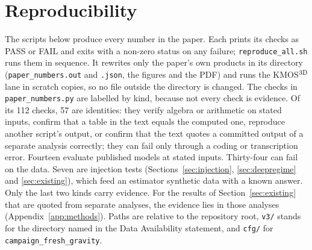 \documentclass[fleqn,usenatbib]{mnras}
\begin{document}
\section{Reproducibility}
\label{app:repro}
The scripts below produce every number in the paper. Each prints its checks as PASS or FAIL and exits with a non-zero status on any failure; \texttt{reproduce\_all.sh} runs them in sequence. It rewrites only the paper's own products in its directory (\texttt{paper\_numbers.out} and \texttt{.json}, the figures and the PDF) and runs the KMOS$^{\rm 3D}$ lane in scratch copies, so no file outside the directory is changed. The checks in \texttt{paper\_numbers.py} are labelled by kind, because not every check is evidence. Of its 112 checks, 57 are identities: they verify algebra or arithmetic on stated inputs, confirm that a table in the text equals the computed one, reproduce another script's output, or confirm that the text quotes a committed output of a separate analysis correctly; they can fail only through a coding or transcription error. Fourteen evaluate published models at stated inputs. Thirty-four can fail on the data. Seven are injection tests (Sections~\ref{sec:injection}, \ref{sec:deepregime} and \ref{sec:existing}), which feed an estimator synthetic data with a known answer. Only the last two kinds carry evidence. For the results of Section~\ref{sec:existing} that are quoted from separate analyses, the evidence lies in those analyses (Appendix~\ref{app:methods}). Paths are relative to the repository root, \texttt{v3/} stands for the directory named in the Data Availability statement, and \texttt{cfg/} for \nolinkurl{campaign_fresh_gravity}.
\end{document}
